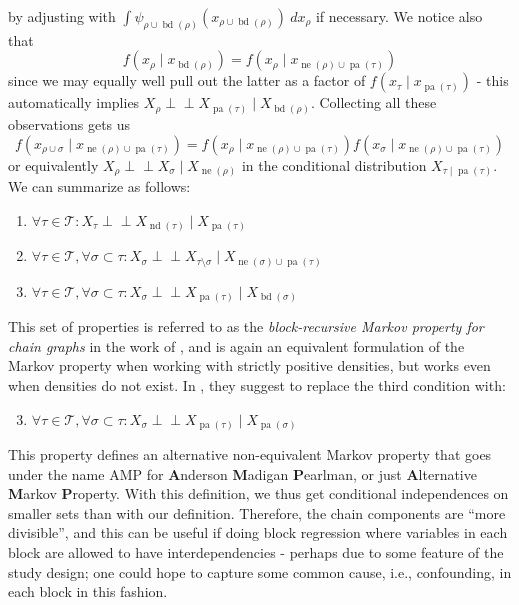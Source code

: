\documentclass[11pt, a4paper]{memoir}
\theoremstyle{break}
\theoremstyle{break}
\theoremstyle{nonumberplain}
\newcommand{\indep}{\perp \!\!\! \perp}
\DeclareMathOperator{\pa}{pa}
\DeclareMathOperator{\nei}{ne}
\DeclareMathOperator{\bd}{bd}
\DeclareMathOperator{\nd}{nd}
\begin{document}
by adjusting with $\int \psi_{\rho\cup\bd(\rho)}(x_{\rho\cup\bd(\rho)})\ dx_\rho$ if necessary. We notice also that $$f\left(x_\rho\mid x_{\bd(\rho)}\right)=f\left(x_\rho\mid x_{\nei(\rho)\cup\pa(\tau)}\right)$$
since we may equally well pull out the latter as a factor of $f\left(x_\tau\mid x_{\pa(\tau)}\right)$ - this automatically implies $X_\rho\indep X_{\pa(\tau)}\mid X_{\bd(\rho)}$. Collecting all these observations gets us
$$f\left(x_{\rho\cup\sigma}\mid x_{\nei(\rho)\cup \pa(\tau)}\right)=f\left(x_{\rho}\mid x_{\nei(\rho)\cup\pa(\tau)}\right)f\left(x_{\sigma}\mid x_{\nei(\rho)\cup\pa(\tau)}\right)$$
or equivalently $X_\rho\indep X_\sigma\mid X_{\nei(\rho)}$ in the conditional distribution $X_{\tau\mid \pa(\tau)}$. We can summarize as follows:
\begin{enumerate}[label=(\roman*)]
	\item $\forall \tau\in \mathscr{T}: X_\tau\indep X_{\nd(\tau)}\mid X_{\pa(\tau)}$
	\item $\forall \tau\in \mathscr{T},\forall \sigma\subset \tau: X_\sigma\indep X_{\tau\setminus \sigma}\mid X_{\nei(\sigma)\cup\pa(\tau)}$
	\item $\forall \tau\in \mathscr{T},\forall \sigma\subset \tau: X_\sigma\indep X_{\pa(\tau)}\mid X_{\bd(\sigma)}$
\end{enumerate}
This set of properties is referred to as the \emph{block-recursive Markov property for chain graphs}	in the work of \cite{AMP}, and is again an equivalent formulation of the Markov property when working with strictly positive densities, but works even when densities do not exist. In \cite{AMP}, they suggest to replace the third condition with:
\begin{enumerate}[label=(\roman*)*]
\setcounter{enumi}{2}
	\item $\forall \tau\in \mathscr{T},\forall \sigma\subset \tau: X_\sigma\indep X_{\pa(\tau)}\mid X_{\pa(\sigma)}$
\end{enumerate}
This property defines an alternative non-equivalent Markov property that goes under the name AMP for \textbf{A}nderson \textbf{M}adigan \textbf{P}earlman, or just \textbf{A}lternative \textbf{M}arkov \textbf{P}roperty. With this definition, we thus get conditional independences on smaller sets than with our definition. Therefore, the chain components are \enquote{more divisible}, and this can be useful if doing block regression where variables in each block are allowed to have interdependencies - perhaps due to some feature of the study design; one could hope to capture some common cause, i.e., confounding, in each block in this fashion.
\end{document}
